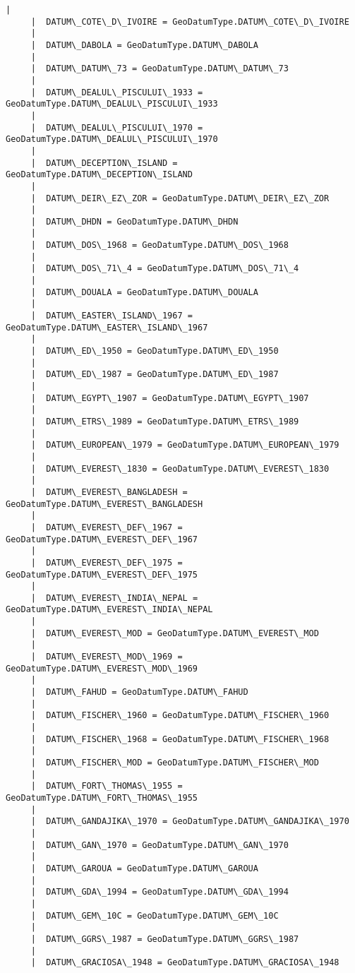 \documentclass[11pt]{article}
\begin{document}
\begin{Verbatim}[commandchars=\\\{\}]
     |  
     |  DATUM\_COTE\_D\_IVOIRE = GeoDatumType.DATUM\_COTE\_D\_IVOIRE
     |  
     |  DATUM\_DABOLA = GeoDatumType.DATUM\_DABOLA
     |  
     |  DATUM\_DATUM\_73 = GeoDatumType.DATUM\_DATUM\_73
     |  
     |  DATUM\_DEALUL\_PISCULUI\_1933 = GeoDatumType.DATUM\_DEALUL\_PISCULUI\_1933
     |  
     |  DATUM\_DEALUL\_PISCULUI\_1970 = GeoDatumType.DATUM\_DEALUL\_PISCULUI\_1970
     |  
     |  DATUM\_DECEPTION\_ISLAND = GeoDatumType.DATUM\_DECEPTION\_ISLAND
     |  
     |  DATUM\_DEIR\_EZ\_ZOR = GeoDatumType.DATUM\_DEIR\_EZ\_ZOR
     |  
     |  DATUM\_DHDN = GeoDatumType.DATUM\_DHDN
     |  
     |  DATUM\_DOS\_1968 = GeoDatumType.DATUM\_DOS\_1968
     |  
     |  DATUM\_DOS\_71\_4 = GeoDatumType.DATUM\_DOS\_71\_4
     |  
     |  DATUM\_DOUALA = GeoDatumType.DATUM\_DOUALA
     |  
     |  DATUM\_EASTER\_ISLAND\_1967 = GeoDatumType.DATUM\_EASTER\_ISLAND\_1967
     |  
     |  DATUM\_ED\_1950 = GeoDatumType.DATUM\_ED\_1950
     |  
     |  DATUM\_ED\_1987 = GeoDatumType.DATUM\_ED\_1987
     |  
     |  DATUM\_EGYPT\_1907 = GeoDatumType.DATUM\_EGYPT\_1907
     |  
     |  DATUM\_ETRS\_1989 = GeoDatumType.DATUM\_ETRS\_1989
     |  
     |  DATUM\_EUROPEAN\_1979 = GeoDatumType.DATUM\_EUROPEAN\_1979
     |  
     |  DATUM\_EVEREST\_1830 = GeoDatumType.DATUM\_EVEREST\_1830
     |  
     |  DATUM\_EVEREST\_BANGLADESH = GeoDatumType.DATUM\_EVEREST\_BANGLADESH
     |  
     |  DATUM\_EVEREST\_DEF\_1967 = GeoDatumType.DATUM\_EVEREST\_DEF\_1967
     |  
     |  DATUM\_EVEREST\_DEF\_1975 = GeoDatumType.DATUM\_EVEREST\_DEF\_1975
     |  
     |  DATUM\_EVEREST\_INDIA\_NEPAL = GeoDatumType.DATUM\_EVEREST\_INDIA\_NEPAL
     |  
     |  DATUM\_EVEREST\_MOD = GeoDatumType.DATUM\_EVEREST\_MOD
     |  
     |  DATUM\_EVEREST\_MOD\_1969 = GeoDatumType.DATUM\_EVEREST\_MOD\_1969
     |  
     |  DATUM\_FAHUD = GeoDatumType.DATUM\_FAHUD
     |  
     |  DATUM\_FISCHER\_1960 = GeoDatumType.DATUM\_FISCHER\_1960
     |  
     |  DATUM\_FISCHER\_1968 = GeoDatumType.DATUM\_FISCHER\_1968
     |  
     |  DATUM\_FISCHER\_MOD = GeoDatumType.DATUM\_FISCHER\_MOD
     |  
     |  DATUM\_FORT\_THOMAS\_1955 = GeoDatumType.DATUM\_FORT\_THOMAS\_1955
     |  
     |  DATUM\_GANDAJIKA\_1970 = GeoDatumType.DATUM\_GANDAJIKA\_1970
     |  
     |  DATUM\_GAN\_1970 = GeoDatumType.DATUM\_GAN\_1970
     |  
     |  DATUM\_GAROUA = GeoDatumType.DATUM\_GAROUA
     |  
     |  DATUM\_GDA\_1994 = GeoDatumType.DATUM\_GDA\_1994
     |  
     |  DATUM\_GEM\_10C = GeoDatumType.DATUM\_GEM\_10C
     |  
     |  DATUM\_GGRS\_1987 = GeoDatumType.DATUM\_GGRS\_1987
     |  
     |  DATUM\_GRACIOSA\_1948 = GeoDatumType.DATUM\_GRACIOSA\_1948

\end{Verbatim}
\end{document}
